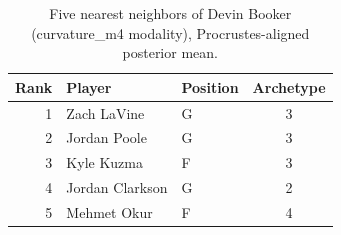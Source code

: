 \begin{table}[htbp]
  \centering\small
  \begin{tabular}{rllc}
    \toprule
    Rank & Player & Position & Archetype \\
    \midrule
    1 & Zach LaVine & G & 3 \\
    2 & Jordan Poole & G & 3 \\
    3 & Kyle Kuzma & F & 3 \\
    4 & Jordan Clarkson & G & 2 \\
    5 & Mehmet Okur & F & 4 \\
    \bottomrule
  \end{tabular}
  \caption{Five nearest neighbors of Devin Booker (curvature_m4 modality), Procrustes-aligned posterior mean.}
  \label{tab:Devin_Booker_neighbors_curvature_m4}
\end{table}

